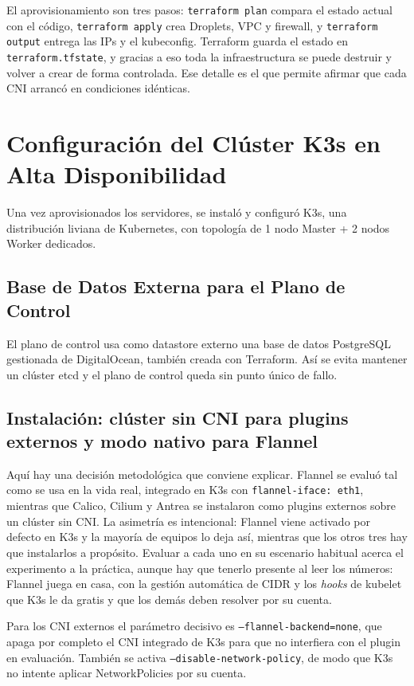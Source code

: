 El aprovisionamiento son tres pasos: \texttt{terraform plan} compara el estado actual con el código, \texttt{terraform apply} crea Droplets, VPC y firewall, y \texttt{terraform output} entrega las IPs y el kubeconfig. Terraform guarda el estado en \texttt{terraform.tfstate}, y gracias a eso toda la infraestructura se puede destruir y volver a crear de forma controlada. Ese detalle es el que permite afirmar que cada CNI arrancó en condiciones idénticas.

\section{Configuración del Clúster K3s en Alta Disponibilidad}

Una vez aprovisionados los servidores, se instaló y configuró K3s, una distribución liviana de Kubernetes, con topología de 1 nodo Master + 2 nodos Worker dedicados.

\subsection{Base de Datos Externa para el Plano de Control}

El plano de control usa como datastore externo una base de datos PostgreSQL gestionada de DigitalOcean, también creada con Terraform. Así se evita mantener un clúster etcd y el plano de control queda sin punto único de fallo.

\subsection{Instalación: clúster sin CNI para plugins externos y modo nativo para Flannel}

Aquí hay una decisión metodológica que conviene explicar. Flannel se evaluó tal como se usa en la vida real, integrado en K3s con \texttt{flannel-iface: eth1}, mientras que Calico, Cilium y Antrea se instalaron como plugins externos sobre un clúster sin CNI. La asimetría es intencional: Flannel viene activado por defecto en K3s y la mayoría de equipos lo deja así, mientras que los otros tres hay que instalarlos a propósito. Evaluar a cada uno en su escenario habitual acerca el experimento a la práctica, aunque hay que tenerlo presente al leer los números: Flannel juega en casa, con la gestión automática de CIDR y los \emph{hooks} de kubelet que K3s le da gratis y que los demás deben resolver por su cuenta.

Para los CNI externos el parámetro decisivo es \texttt{--flannel-backend=none}, que apaga por completo el CNI integrado de K3s para que no interfiera con el plugin en evaluación. También se activa \texttt{--disable-network-policy}, de modo que K3s no intente aplicar NetworkPolicies por su cuenta.

